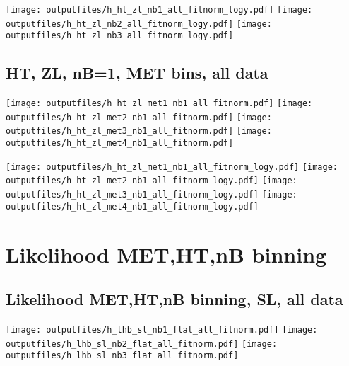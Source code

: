 \documentclass[11pt]{article}
\begin{document}
    \noindent
     \texttt{[image: outputfiles/h\_ht\_zl\_nb1\_all\_fitnorm\_logy.pdf]}
     \texttt{[image: outputfiles/h\_ht\_zl\_nb2\_all\_fitnorm\_logy.pdf]}
     \texttt{[image: outputfiles/h\_ht\_zl\_nb3\_all\_fitnorm\_logy.pdf]}


   \clearpage

     \subsection{ HT, ZL, nB=1, MET bins, all data}

    \noindent
     \texttt{[image: outputfiles/h\_ht\_zl\_met1\_nb1\_all\_fitnorm.pdf]}
     \texttt{[image: outputfiles/h\_ht\_zl\_met2\_nb1\_all\_fitnorm.pdf]}
     \texttt{[image: outputfiles/h\_ht\_zl\_met3\_nb1\_all\_fitnorm.pdf]}
     \texttt{[image: outputfiles/h\_ht\_zl\_met4\_nb1\_all\_fitnorm.pdf]}

    \noindent
     \texttt{[image: outputfiles/h\_ht\_zl\_met1\_nb1\_all\_fitnorm\_logy.pdf]}
     \texttt{[image: outputfiles/h\_ht\_zl\_met2\_nb1\_all\_fitnorm\_logy.pdf]}
     \texttt{[image: outputfiles/h\_ht\_zl\_met3\_nb1\_all\_fitnorm\_logy.pdf]}
     \texttt{[image: outputfiles/h\_ht\_zl\_met4\_nb1\_all\_fitnorm\_logy.pdf]}

   \clearpage







   \section{Likelihood MET,HT,nB binning}
    \subsection{ Likelihood MET,HT,nB binning, SL, all data}

    \noindent
     \texttt{[image: outputfiles/h\_lhb\_sl\_nb1\_flat\_all\_fitnorm.pdf]}
     \texttt{[image: outputfiles/h\_lhb\_sl\_nb2\_flat\_all\_fitnorm.pdf]}
     \texttt{[image: outputfiles/h\_lhb\_sl\_nb3\_flat\_all\_fitnorm.pdf]}
\end{document}
